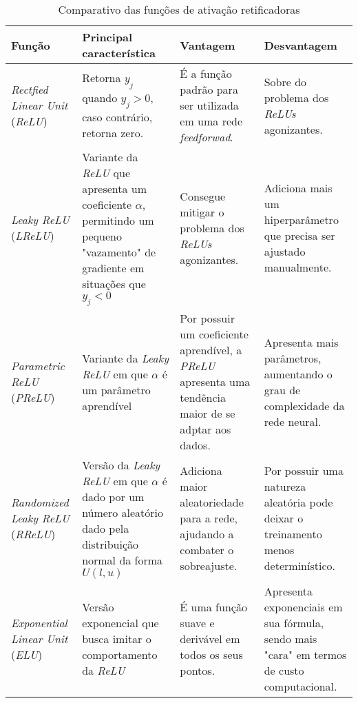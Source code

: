 \begin{table}[htbp]
    \centering
    \begin{threeparttable}
        \caption{Comparativo das funções de ativação retificadoras}
        \label{tab:comparativo-funcoes-retificadoras}
        \begin{tabularx}{\textwidth}{p{3.2cm} *{3}{>{\raggedright\arraybackslash}X}}
            \toprule
            \textbf{Função} & \textbf{Principal característica} &\textbf{Vantagem} & \textbf{Desvantagem} \\
            \midrule
            \textit{Rectfied Linear Unit} (\textit{ReLU}) & Retorna $y_j$ quando $y_j > 0$, caso contrário, retorna zero. & É a função padrão para ser utilizada em uma rede \textit{feedforwad}. & Sobre do problema dos \textit{ReLUs} agonizantes. \\
            \addlinespace
            \textit{Leaky ReLU} (\textit{LReLU}) & Variante da \textit{ReLU} que apresenta um coeficiente $\alpha$, permitindo um pequeno "vazamento" de gradiente em situações que $y_j < 0$ & Consegue mitigar o problema dos \textit{ReLUs} agonizantes. & Adiciona mais um hiperparâmetro que precisa ser ajustado manualmente. \\
            \addlinespace
            \textit{Parametric ReLU} (\textit{PReLU}) & Variante da \textit{Leaky ReLU} em que $\alpha$ é um parâmetro aprendível & Por possuir um coeficiente aprendível, a \textit{PReLU} apresenta uma tendência maior de se adptar aos dados. & Apresenta mais parâmetros, aumentando o grau de complexidade da rede neural. \\
            \addlinespace
            \textit{Randomized Leaky ReLU} (\textit{RReLU}) & Versão da \textit{Leaky ReLU} em que $\alpha$ é dado por um número aleatório dado pela distribuição normal da forma $U(l, u)$ & Adiciona maior aleatoriedade para a rede, ajudando a combater o sobreajuste. & Por possuir uma natureza aleatória pode deixar o treinamento menos determinístico.  \\
            \addlinespace
            \textit{Exponential Linear Unit} (\textit{ELU}) & Versão exponencial que busca imitar o comportamento da \textit{ReLU} & É uma função suave e derivável em todos os seus pontos. & Apresenta exponenciais em sua fórmula, sendo mais "cara" em termos de custo computacional. \\

\end{tabularx}
\end{threeparttable}
\end{table}

